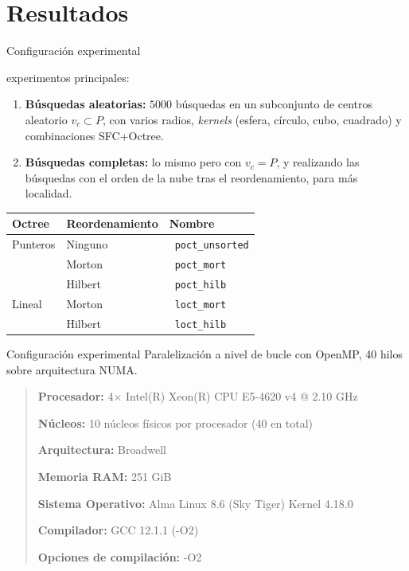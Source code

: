 \documentclass[aspectratio=169]{beamer}
\newcommand{\dotUnencoded}{\textcolor{octUnencoded}{\textbullet}~}
\newcommand{\dotOctMort}{\textcolor{octMort}{\textbullet}~}
\newcommand{\dotOctHilb}{\textcolor{octHilb}{\textbullet}~}
\newcommand{\dotLoctMort}{\textcolor{loctMort}{\textbullet}~}
\newcommand{\dotLoctHilb}{\textcolor{loctHilb}{\textbullet}~}
\begin{document}
\section{Resultados}
\begin{frame}{Configuración experimental}

    \textrightarrow {} experimentos principales:
    \begin{enumerate}
        \item \textbf{Búsquedas aleatorias:} $5000$ búsquedas en un subconjunto de centros aleatorio $v_c \subset P$, con varios radios, \textit{kernels} (esfera, círculo, cubo, cuadrado) y combinaciones SFC+Octree. 
        \item \textbf{Búsquedas completas:} lo mismo pero con $v_c = P$, y realizando las búsquedas con el orden de la nube tras el reordenamiento, para más localidad.
    \end{enumerate}

    \begin{table}
    
        \begin{tabular}{@{}lll@{}}
            \textbf{Octree} & \textbf{Reordenamiento} & \textbf{Nombre} \\
            \hline
            Punteros        & Ninguno       & \dotUnencoded \texttt{poct\_unsorted} \\
                            & Morton        & \dotOctMort \texttt{poct\_mort} \\
                            & Hilbert       & \dotOctHilb \texttt{poct\_hilb} \\
            \hline
            Lineal          & Morton        & \dotLoctMort \texttt{loct\_mort} \\
                            & Hilbert       & \dotLoctHilb \texttt{loct\_hilb} \\
        \end{tabular}
    \end{table}
\end{frame}
\begin{frame}{Configuración experimental}
    \textrightarrow \: Paralelización a nivel de bucle con OpenMP, 40 hilos sobre arquitectura NUMA.

    \begin{quote}
        \noindent \textbf{Procesador:} 4× Intel(R) Xeon(R) CPU E5-4620 v4 @ 2.10 GHz  

        \noindent \textbf{Núcleos:} 10 núcleos físicos por procesador (40 en total)  

        \noindent \textbf{Arquitectura:} Broadwell  

        \noindent \textbf{Memoria RAM:} 251 GiB

        \noindent \textbf{Sistema Operativo:} Alma Linux 8.6 (Sky Tiger) Kernel 4.18.0

        \noindent \textbf{Compilador:} GCC 12.1.1 (-O2)

    \noindent \textbf{Opciones de compilación:} -O2

\end{quote}


\end{frame}
\end{document}
